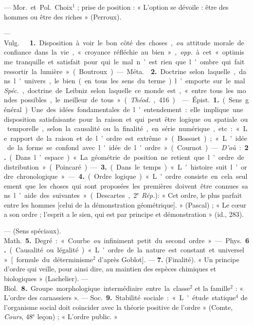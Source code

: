 \begin{itemize}[leftmargin=1cm, label=, itemsep=1pt]
 — \si{Mor.} et \si{Pol.} Choix$^1$ ; prise de position : «
L'option se dévoile : être des hommes ou être des riches » (Perroux).

 — \si{Vulg.}   {\bf 1.}
Disposition à voir le bon côté des choses, {\it ou} attitude morale de
confiance dans la vie, « croyance réfléchie au bien », {\it opp.} à cet «
optimisme tranquille et satisfait pour qui le mal n’est rien que l'ombre qui
fait ressortir la lumière » (Boutroux).

— \si{Méta.}  {\bf 2.} Doctrine selon laquelle, dans
l'univers, le bien (en tous les sens du terme) l’emporte sur le mal.
{\it Spéc.}, doctrine de Leibniz selon laquelle ce monde est, « entre tous
les mondes possibles, le meilleur de tous » ({\it Théod.}, 416).

 — \si{Épist.} {\bf 1.} (Sens général). Une des idées fondamentales
de l’entendement : elle implique une disposition satisfaisante pour la raison
et qui peut être logique ou spatiale ou temporelle, selon la causalité ou la
finalité, en série numérique, etc : « Le rapport de la raison et de l’ordre
est extrême » (Bossuet) ; « L'idée de la forme se confond avec l'idée de
l’ordre » (Cournot). — {\it D'où} : {\bf 2.} (Dans l’espace). « La géométrie
de position ne retient que l’ordre de distribution » (Poincaré). — {\bf 3.}
(Dans le temps). « L'histoire suit l’ordre chronologique ». — {\bf 4.} (Ordre
logique). « L'ordre consiste en cela seulement que les choses qui sont
proposées les premières doivent être connues sans l’aide des suivantes
» (Descartes, 2$^\text{e}$ {\it Rép.}): « Cet ordre, le plus parfait entre
les hommes [celui de la démonstration géométrique]. » (Pascal) ; « Le cœur a
son ordre ; l'esprit a le sien, qui est par principe et démonstration » (id.,
283).

— (Sens spéciaux). \si{Math.} {\bf 5.} Degré : « Courbe {\it ou} infiniment
petit du second ordre ». — \si{Phys.} {\bf 6.} (Causalité ou légalité). «
L'ordre de la nature est constant et universel » [formule du déterminisme$^2$
d’après
Goblot]. — {\bf 7.} (Finalité). « Un principe d'ordre qui veille, pour ainsi
dire, au maintien des espèces chimiques et biologiques » (Lachelier). —
\si{Biol.} {\bf 8.} Groupe morphologique intermédiaire entre la classe$^2$ et
la famille$^2$ : « L'ordre des carnassiers ». — \si{Soc.} {\bf 9.} Stabilité
sociale : « L'étude statique$^4$ de l’organisme social doit coïncider avec la
théorie positive de l'ordre » (Comte, {\it Cours}, 48$^\text{e}$ leçon) ;
« L'ordre public. »


\end{itemize}
